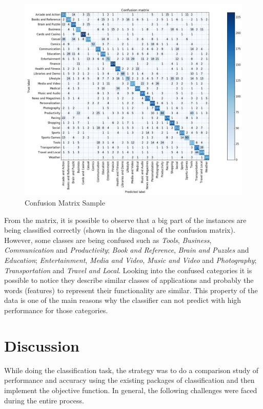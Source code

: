 \documentclass[letterpaper,10pt]{article}
\theoremstyle{mytheor}
\begin{document}
\begin{figure}[H]
\includegraphics[width=\textwidth]{cm}
\centering
\caption{Confusion Matrix Sample}
\label{fig:4}
\end{figure}

From the matrix, it is possible to observe that a big part of the instances are being classified correctly (shown in the diagonal of the confusion matrix). However, some classes are being confused such as \textit{Tools}, \textit{Business}, \textit{Communication} and \textit{Productivity}; \textit{Book and Reference}, \textit{Brain and Puzzles} and \textit{Education}; \textit{Entertainment}, \textit{Media and Video}, \textit{Music and Video} and \textit{Photography}; \textit{Transportation} and \textit{Travel and Local}. Looking into the confused categories it is possible to notice they describe similar classes of applications and probably the words (features) to represent their functionality are similar. This property of the data is one of the main reasons why the classifier can not predict with high performance for those categories.    

\section{Discussion}

While doing the classification task, the strategy was to do a comparison study of performance and accuracy using the existing packages of classification and then implement the objective function. In general, the following challenges were faced during the entire process.
\end{document}
